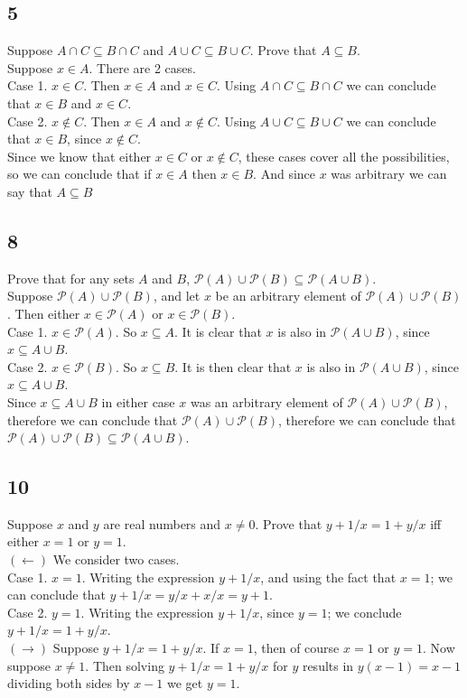 \documentclass{article}
\begin{document}
\subsection{5}
Suppose $A\cap C \subseteq B \cap C$ and $A \cup C \subseteq B \cup C$. Prove that $A \subseteq B$. $ $\\
Suppose  $x \in A$. There are 2 cases. $ $ \\
Case 1. $x \in C$. Then $x \in A$ and $x \in C$. Using $A \cap C \subseteq B \cap C$ we can conclude that $x \in B$ and $x \in C$. $ $ \\
Case 2. $x \notin C$. Then $x \in A$ and $x \notin C$. Using $A \cup C \subseteq B \cup C$ we can conclude that $x \in B$, since $x \notin C$.
$ $ \\
Since we know that either $x \in C$ or $x \notin C$, these cases cover all the possibilities, so we can conclude that if $x \in A$ then $x \in B$. And since $x$ was arbitrary we can say that $A \subseteq B$
\subsection{8}
Prove that for any sets $A$ and $B$, $\mathscr{P}(A) \cup \mathscr{P}(B) \subseteq \mathscr{P}(A \cup B)$. $ $ \\
Suppose $\mathscr{P}(A)\cup \mathscr{P}(B)$, and let $x$ be an arbitrary element of $\mathscr{P}(A)\cup \mathscr{P}(B)$. Then either $x \in \mathscr{P}(A)$ or $x \in \mathscr{P}(B)$. $ $ \\
Case 1. $x \in \mathscr{P}(A)$. So $x \subseteq A$. It is clear that $x$ is also in $\mathscr{P}(A \cup B)$, since $x \subseteq A \cup B$.
$ $\\
Case 2. $x \in \mathscr{P}(B)$. So $x \subseteq B$. It is then clear that $x$ is also in $\mathscr{P}(A \cup B)$, since $x \subseteq A \cup B$.
$ $\\
Since $x \subseteq A \cup B$ in either case $x$ was an arbitrary element of $\mathscr{P }(A)\cup \mathscr{P}(B)$, therefore we can conclude that $\mathscr{P}(A)\cup \mathscr{P}(B)$, therefore we can conclude that $\mathscr{P}(A) \cup \mathscr{P}(B)\subseteq \mathscr{P}(A \cup B)$.
\subsection{10}
Suppose $x$ and $y$ are real numbers and $x \neq 0$. Prove that $y + 1/x = 1 + y/x$ iff either $x =1$ or $y=1$. $ $\\
$(\leftarrow)$
We consider two cases. $ $ \\
Case 1. $x = 1$. Writing the expression $y + 1/x$, and using the fact that $x = 1$; we can conclude that $y + 1/x = y/x + x/x = y + 1$. 
$ $\\
Case 2. $y = 1$. Writing the expression $y + 1/x$, since $y = 1$; we conclude $y + 1/x = 1 + y/x$.
$ $\\
$(\rightarrow)$
Suppose $y + 1/x = 1 + y/x$. If $x = 1$, then of course $x = 1$ or $y = 1$. Now suppose $x \neq 1$. Then solving $y + 1/x = 1+y/x$ for $y$ results in $y(x-1)=x-1$ dividing both sides by $x-1$ we get $y=1$.
\end{document}
